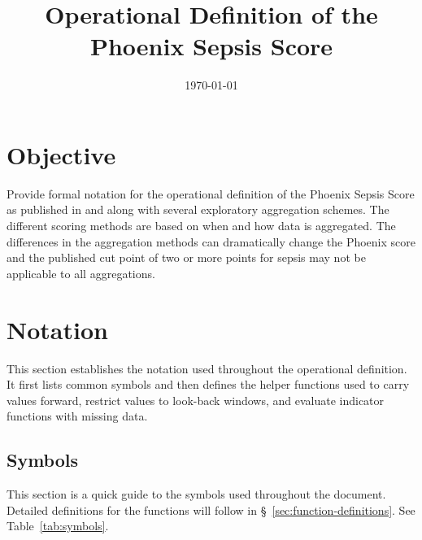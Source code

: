 \documentclass[letterpaper,10pt]{article}
\title{Operational Definition of the Phoenix Sepsis Score}
\date{\today}
\begin{document}
\maketitle
\renewcommand*\contentsname{Table of contents}
{
\hypersetup{linkcolor=}
\tableofcontents
}

{
\hypersetup{linkcolor=}
\listoftables
}
\pagebreak

\section{Objective}\label{sec:objective}

Provide formal notation for the operational definition of the Phoenix
Sepsis Score as published in \citet{Sanchez-Pinto2024} and
\citet{Schlapbach2024} along with several exploratory aggregation schemes.  The different
scoring methods are based on when and how data is aggregated.  The differences
in the aggregation methods can dramatically change the Phoenix score and the
published cut point of two or more points for sepsis may not be applicable to
all aggregations.

\section{Notation}\label{sec:notation}

This section establishes the notation used throughout the operational
definition. It first lists common symbols and then defines the helper functions
used to carry values forward, restrict values to look-back windows, and evaluate
indicator functions with missing data.

\subsection{Symbols}\label{sec:symbols}

This section is a quick guide to the symbols used throughout the document.
Detailed definitions for the functions will follow in
\S~\ref{sec:function-definitions}. See Table~\ref{tab:symbols}.
\end{document}
